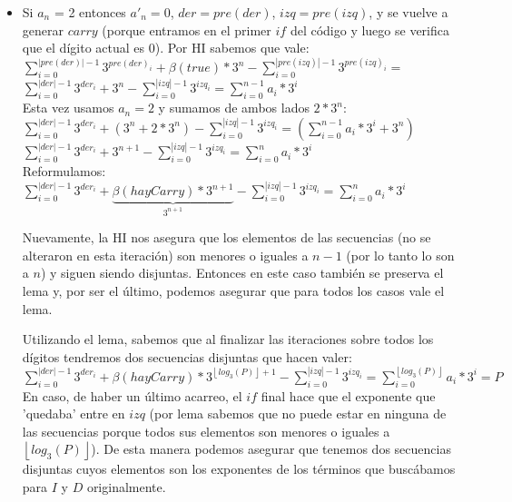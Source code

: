 \begin{itemize}
	\item Si $a_n$ = 2 entonces $a'_n = 0$, $der = pre(der)$, $izq = pre(izq)$, y se vuelve a generar $carry$ (porque entramos en el primer $if$ del código y luego se verifica que el dígito actual es 0). Por HI sabemos que vale: \\

	$\sum_{i=0}^{|pre(der)|-1} 3^{pre(der)_i} + \beta(true)*3^{n} - \sum_{i=0}^{|pre(izq)|-1} 3^{pre(izq)_i} =$
	\\

	$\sum_{i=0}^{|der|-1} 3^{der_i} + 3^{n} - \sum_{i=0}^{|izq|-1} 3^{izq_i} = \sum_{i=0}^{n-1} a_i*3^{i} $
	\\

	Esta vez usamos $a_n = 2$ y sumamos de ambos lados $2*3^n$:
	\\

	$\sum_{i=0}^{|der|-1} 3^{der_i} + (3^{n} + 2*3^{n}) - \sum_{i=0}^{|izq|-1} 3^{izq_i} = (\sum_{i=0}^{n-1} a_i*3^{i} + 3^{n}) $
	\\

	$\sum_{i=0}^{|der|-1} 3^{der_i} + 3^{n+1} - \sum_{i=0}^{|izq|-1} 3^{izq_i} = \sum_{i=0}^{n} a_i*3^{i} $	\\

	Reformulamos: \\

	$\sum_{i=0}^{|der|-1} 3^{der_i} + \underbrace{\beta(hayCarry)*3^{n+1}}_\text{$3^{n+1}$} - \sum_{i=0}^{|izq|-1} 3^{izq_i} = \sum_{i=0}^{n} a_i*3^{i} $

	Nuevamente, la HI nos asegura que los elementos de las secuencias (no se alteraron en esta iteración) son menores o iguales a $n-1$ (por lo tanto lo son a $n$) y siguen siendo disjuntas. Entonces en este caso también se preserva el lema y, por ser el último, podemos asegurar que para todos los casos vale el lema. \QEDB

	Utilizando el lema, sabemos que al finalizar las iteraciones sobre todos los dígitos tendremos dos secuencias disjuntas que hacen valer:
	\\

	$\sum_{i=0}^{|der|-1} 3^{der_i} + \beta(hayCarry)*3^{\left \lfloor{log_3(P)}\right \rfloor + 1} - \sum_{i=0}^{|izq|-1} 3^{izq_i} = \sum_{i=0}^{\left \lfloor{log_3(P)}\right \rfloor} a_i*3^{i} = P$
	\\

	En caso, de haber un último acarreo, el $if$ final hace que el exponente que 'quedaba' entre en $izq$ (por lema sabemos que no puede estar en ninguna de las secuencias porque todos sus elementos son menores o iguales a $\left \lfloor{log_3(P)}\right \rfloor$). De esta manera podemos asegurar que tenemos dos secuencias disjuntas cuyos elementos son los exponentes de los términos que buscábamos para $I$ y $D$ originalmente.


	\end{itemize}

